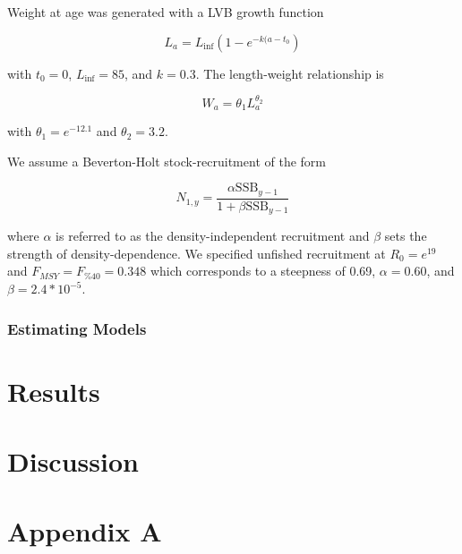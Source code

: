 \documentclass[11pt]{article}
\begin{document}
Weight at age was generated with a LVB growth function

$$ L_a = L_{\inf} \left( 1 - e^{-k(a-t_0}  \right)$$

with $t_0 = 0$, $L_{\inf}=85$, and $k=0.3$. The length-weight relationship is

$$W_a = \theta_1 L_a^{\theta_2}$$

with $\theta_1 = e^{-12.1}$ and $\theta_2 = 3.2$.

We assume a Beverton-Holt stock-recruitment of the form 

$$ N_{1,y} = \frac{\alpha\mathrm{SSB}_{y-1}}{1 + \beta \mathrm{SSB}_{y-1}} $$

where $\alpha$ is referred to as the density-independent recruitment and $\beta$ sets the strength of density-dependence. 
We specified unfished recruitment at $R_0 = e^{19}$ and $F_{MSY} = F_{\%40} = 0.348$ which corresponds to a steepness of 0.69, $\alpha=0.60$, and $\beta=2.4*10^{-5}$.

\subsubsection*{Estimating Models}


\section*{Results}

\section*{Discussion}


\section*{Appendix A}






 
\end{document}
